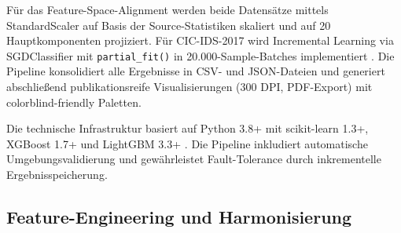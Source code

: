 \documentclass[11pt,a4paper]{article}
\begin{document}
    Für das Feature-Space-Alignment werden beide Datensätze mittels StandardScaler auf Basis der Source-Statistiken skaliert und auf 20 Hauptkomponenten projiziert. Für CIC-IDS-2017 wird Incremental Learning via SGDClassifier mit \texttt{partial\_fit()} in 20.000-Sample-Batches implementiert \parencite{Bishop2006}. Die Pipeline konsolidiert alle Ergebnisse in CSV- und JSON-Dateien und generiert abschließend publikationsreife Visualisierungen (300 DPI, PDF-Export) mit colorblind-friendly Paletten.

    Die technische Infrastruktur basiert auf Python 3.8+ mit scikit-learn 1.3+, XGBoost 1.7+ und LightGBM 3.3+ \parencite{Weirauch2025}. Die Pipeline inkludiert automatische Umgebungsvalidierung und gewährleistet Fault-Tolerance durch inkrementelle Ergebnisspeicherung.

    \subsection{Feature-Engineering und Harmonisierung}
\end{document}
